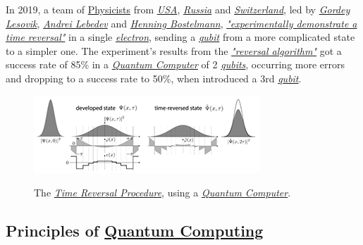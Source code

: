 \documentclass[conference]{IEEEtran}
\begin{document}
\vspace{4pt}

In 2019, a team of \href{https://en.wikipedia.org/wiki/Physicist}{Physicists} from \href{https://en.wikipedia.org/wiki/United_States}{\textit{USA}}, \href{https://en.wikipedia.org/wiki/Russia}{\textit{Russia}} and \href{https://en.wikipedia.org/wiki/Switzerland}{\textit{Switzerland}}, led by \href{https://www.researchgate.net/profile/Gordey_Lesovik}{\textit{Gordey Lesovik}}, \href{https://www.researchgate.net/profile/Andrey_Lebedev4}{\textit{Andrei Lebedev}} and \href{https://www.researchgate.net/profile/Henning_Bostelmann}{\textit{Henning Bostelmann}}, \href{https://en.wikipedia.org/wiki/Electron}{\textit{"experimentally demonstrate a time reversal"}} in a single \href{https://en.wikipedia.org/wiki/Electron}{\textit{electron}}, sending a \href{https://en.wikipedia.org/wiki/Qubit}{\textit{qubit}} from a more complicated state to a simpler one. The experiment's results from the \href{https://www.researchgate.net/publication/322160389_Arrow_of_time_and_its_reversal_on_IBM_quantum_computer}{\textit{"reversal algorithm"}} got a success rate of 85\% in a \href{https://en.wikipedia.org/wiki/Quantum_computing}{\textit{Quantum Computer}} of 2 \href{https://en.wikipedia.org/wiki/Qubit}{\textit{qubits}}, occurring more errors and dropping to a success rate to 50\%, when introduced a 3rd \href{https://en.wikipedia.org/wiki/Qubit}{\textit{qubit}}.

\begin{center}
  \begin{figure}[htbp]
    \centerline{\href{https://www.nature.com/articles/s41598-019-40765-6}{\includegraphics{imgs/fig-1.png}}}
    \caption{The \href{https://www.nature.com/articles/s41598-019-40765-6}{\textit{Time Reversal Procedure}}, using a \href{https://en.wikipedia.org/wiki/Quantum_computing}{\textit{Quantum Computer}}.}
    \label{fig}
  \end{figure}
\end{center}

\newpage

\subsection{Principles of \href{https://en.wikipedia.org/wiki/Quantum_computing}{Quantum Computing}}\label{AA}
\end{document}
